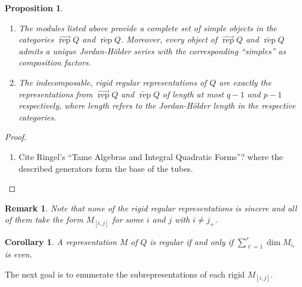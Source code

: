 \documentclass[12pt]{amsart}
\newcommand{\rep}{\operatorname{rep}}
\newtheorem{corollary}[theorem]{Corollary}
\newtheorem{proposition}[theorem]{Proposition}
\newtheorem{remark}[theorem]{Remark}
\numberwithin{equation}{section}
\begin{document}
  \begin{proposition}\mbox{}
    \begin{enumerate}
      \item The modules listed above provide a complete set of simple objects in the categories $\overrightarrow{\rep}Q$ and $\overleftarrow{\rep}Q$.  Moreover, every object of $\overrightarrow{\rep}Q$ and $\overleftarrow{\rep}Q$ admits a unique Jordan-H\"older series with the corresponding ``simples'' as composition factors.
      \item The indecomposable, rigid regular representations of $Q$ are exactly the representations from $\overrightarrow{\rep}Q$ and $\overleftarrow{\rep}Q$ of length at most $q-1$ and $p-1$ respectively, where length refers to the Jordan-H\"older length in the respective categories.  
    \end{enumerate}
  \end{proposition}
  \begin{proof}
    \begin{enumerate}
      \item Cite Ringel's ``Tame Algebras and Integral Quadratic Forms''?  \cite[Theorem 3.6.5]{Rin84} where the described generators form the base of the tubes.
    \end{enumerate}
  \end{proof}
  \begin{remark}\label{rem:rigid regulars}
    Note that none of the rigid regular representations is sincere and all of them take the form $M_{[i,j]}$ for some $i$ and $j$ with $i\ne j_+$.
  \end{remark}

  \begin{corollary}
    A representation $M$ of $Q$ is regular if and only if $\sum\limits_{\ell=1}^r\dim M_{i_\ell}$ is even.
  \end{corollary}

  The next goal is to enumerate the subrepresentations of each rigid $M_{[i,j]}$.  
\end{document}
